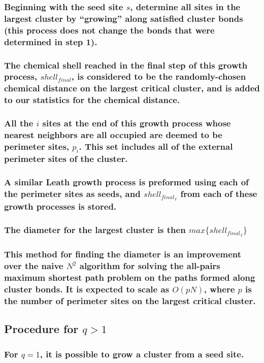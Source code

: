 \documentclass{umthesis}
\begin{document}
\subsubsection{Beginning with the seed site $s$, determine all sites in the largest cluster by ``growing'' along satisfied cluster bonds (this process does not change the bonds that were determined in step 1).}
\label{sec-3.2.3.3}
\subsubsection{The chemical shell reached in the final step of this growth process, $shell_{final}$, is considered to be the randomly-chosen chemical distance on the largest critical cluster, and is added to our statistics for the chemical distance.}
\label{sec-3.2.3.4}
\subsubsection{All the $i$ sites at the end of this growth process whose nearest neighbors are all occupied are deemed to be perimeter sites, $p_i$.  This set includes all of the external perimeter sites of the cluster.}
\label{sec-3.2.3.5}
\subsubsection{A similar Leath growth process is preformed using each of the perimeter sites as seeds, and ${shell_{final}}_i$ from each of these growth processes is stored.}
\label{sec-3.2.3.6}
\subsubsection{The diameter for the largest cluster is then $max\{{shell_{final}}_i\}$}
\label{sec-3.2.3.7}
\subsubsection{This method for finding the diameter is an improvement over the naive $N^2$ algorithm for solving the all-pairs maximum shortest path problem on the paths formed along cluster bonds. It is expected to scale as $O(pN)$, where $p$ is the number of perimeter sites on the largest critical cluster.}
\label{sec-3.2.3.8}
\subsection{Procedure for $q>1$}
\label{sec-3.2.4}
\subsubsection{For $q=1$, it is possible to grow a cluster from a seed site.}
\label{sec-3.2.4.1}
\end{document}
